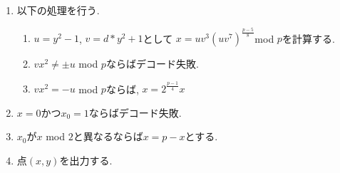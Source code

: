 \begin{enumerate}
\begin{enumerate}
    \item 以下の処理を行う.
    \begin{enumerate}
      \item $u=y^2-1$, $v=d*y^2+1$として
      $x=uv^3(uv^7)^{\tfrac{p-5}{8}}$mod $p$を計算する.
      \item $vx^2 \neq \pm  u$ mod $p$ならばデコード失敗.
      \item $vx^2=-u$ mod $p$ならば, $x=2^{\tfrac{p-1}{4}}x$
    \end{enumerate}
    \item $x=0$かつ$x_0=1$ならばデコード失敗.
    \item $x_0$が$x$ mod $2$と異なるならば$x=p-x$とする.
    \item 点$(x,y)$を出力する.
  \end{enumerate}
\end{enumerate}

